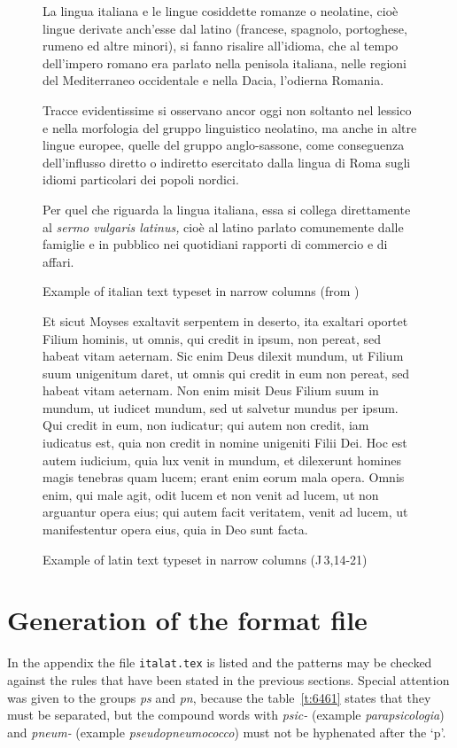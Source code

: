 \begin{figure*}
\begin{trecolonne}\italiano
La lingua italiana e le lingue cosiddette romanze o neolatine, cio\`e lingue
derivate anch'esse dal latino (francese,  spagnolo,  portoghese,  rumeno  ed
altre minori), si fanno risalire all'idioma, che al tempo dell'impero romano
era  parlato  nella  penisola  italiana,  nelle  regioni  del   Mediterraneo
occidentale e nella Dacia, l'odierna Romania.

Tracce  evidentissime  si  osservano  ancor  oggi non soltanto nel lessico e
nella morfologia del gruppo linguistico neolatino, ma anche in altre  lingue
europee,  quelle  del  gruppo  anglo-sassone, come conseguenza dell'influsso
diretto o indiretto esercitato dalla lingua di Roma sugli idiomi particolari
dei popoli nordici.

Per  quel  che  riguarda la lingua italiana, essa si collega direttamente al
{\it sermo vulgaris la\-ti\-nus,} cio\`e al latino parlato comunemente dalle
famiglie e in pubblico nei quotidiani rapporti di commercio e di affari.
 \end{trecolonne}
\caption[]{Example of italian text typeset in narrow columns (from
\cite{manna})}
 \medskip
\begin{trecolonne}\latino
Et  sicut Moyses exaltavit serpentem in deserto, ita exaltari oportet Filium
hominis, ut omnis, qui  credit  in  ipsum,  non  pereat,  sed  habeat  vitam
aeternam.  Sic enim Deus dilexit mundum, ut Filium suum unigenitum daret, ut
omnis qui credit in eum non pereat, sed  habeat  vitam  aeternam.  Non  enim
misit  Deus Filium suum in mundum, ut iudicet mundum, sed ut salvetur mundus
per ipsum. Qui credit in eum, non  iudicatur;  qui  autem  non  credit,  iam
iudicatus  est, quia non credit in nomine unigeniti Filii Dei. Hoc est autem
iudicium, quia lux venit in mundum, et  dilexerunt  homines  magis  tenebras
quam  lucem;  erant  enim  eorum mala opera. Omnis enim, qui male agit, odit
lucem et non venit ad lucem, ut non arguantur opera eius;  qui  autem  facit
veritatem,  venit  ad  lucem,  ut manifestentur opera eius, quia in Deo sunt
facta.
 \end{trecolonne}
\caption[]{Example of latin text typeset in narrow columns (J\,3,14-21)}
\end{figure*}


\section{Generation of the format file}
In  the appendix the file {\tt italat.tex} is listed and the patterns may be
checked against the rules that have been stated in  the  previous  sections.
Special attention was given to the groups {\it ps} and {\it pn}, because the
table~\ref{t:6461} states that they must  be  separated,  but  the  compound
words  with  {\it  psic-}  (example {\it parapsicologia\/}) and {\it pneum-}
(example {\it pseudopneumococco\/}) must not be hyphenated after the `p'.

